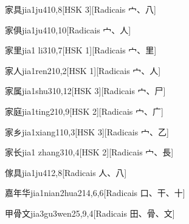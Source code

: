 \begin{entry}{家具}{jia1ju4}{10,8}[HSK 3][Radicais ⼧、⼋]
\end{entry}

\begin{entry}{家俱}{jia1ju4}{10,10}[Radicais ⼧、⼈]
\end{entry}

\begin{entry}{家里}{jia1 li3}{10,7}[HSK 1][Radicais ⼧、⾥]
\end{entry}

\begin{entry}{家人}{jia1ren2}{10,2}[HSK 1][Radicais ⼧、⼈]
\end{entry}

\begin{entry}{家属}{jia1shu3}{10,12}[HSK 3][Radicais ⼧、⼫]
\end{entry}

\begin{entry}{家庭}{jia1ting2}{10,9}[HSK 2][Radicais ⼧、⼴]
\end{entry}

\begin{entry}{家乡}{jia1xiang1}{10,3}[HSK 3][Radicais ⼧、⼄]
\end{entry}

\begin{entry}{家长}{jia1 zhang3}{10,4}[HSK 2][Radicais ⼧、⾧]
\end{entry}

\begin{entry}{傢具}{jia1ju4}{12,8}[Radicais ⼈、⼋]
\end{entry}

\begin{entry}{嘉年华}{jia1nian2hua2}{14,6,6}[Radicais ⼝、⼲、⼗]
\end{entry}

\begin{entry}{甲骨文}{jia3gu3wen2}{5,9,4}[Radicais ⽥、⾻、⽂]
\end{entry}

